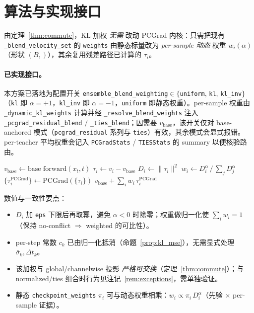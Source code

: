 \documentclass[11pt,a4paper]{article}
\newcommand{\PC}{\mathrm{PCGrad}}
\newcommand{\vb}{v_{\mathrm{base}}}
\newcommand{\norm}[1]{\lVert #1\rVert}
\theoremstyle{plain}
\theoremstyle{definition}
\begin{document}
\section{算法与实现接口}

由定理~\ref{thm:commute}，KL 加权 \emph{无需} 改动 PCGrad 内核：只需把现有 \texttt{\_blend\_velocity\_set} 的 \texttt{weights} 由静态标量改为 \emph{per-sample 动态} 权重 $w_i(\alpha)$（形状 $(B,)$），其余复用残差路径已计算的 $\tau_i$。

\paragraph{已实现接口。} 本方案已落地为配置开关 \texttt{ensemble\_blend\_weighting}$\in\{$\texttt{uniform}, \texttt{kl}, \texttt{kl\_inv}$\}$（\texttt{kl} 即 $\alpha{=}{+}1$，\texttt{kl\_inv} 即 $\alpha{=}{-}1$，\texttt{uniform} 即静态权重）。per-sample 权重由 \texttt{\_dynamic\_kl\_weights} 计算并经 \texttt{\_resolve\_blend\_weights} 注入 \texttt{\_pcgrad\_residual\_blend} / \texttt{\_ties\_blend}；因需要 $\vb$，该开关仅对 base-anchored 模式（\texttt{pcgrad\_residual} 系列与 \texttt{ties}）有效，其余模式会显式报错。per-teacher 平均权重会记入 \texttt{PCGradStats} / \texttt{TIESStats} 的 summary 以便核验路由。

\begin{algorithm}[h]
\caption{KL-Weighted Residual Fusion（per denoising step, per sample）}
\begin{algorithmic}[1]
\State $\vb \gets \text{base forward}(x_t,t)$ 
 
  \State $\tau_i \gets v_i - \vb$
  \State $D_i \gets \norm{\tau_i}^2$ 
\EndFor
\State $w_i \gets D_i^{\alpha}\,/\,\sum_j D_j^{\alpha}$ 
\State $\{\tau_i^{\PC}\} \gets \PC(\{\tau_i\})$ 
\State \Return $\vb + \sum_i w_i\,\tau_i^{\PC}$ 
\end{algorithmic}
\end{algorithm}

\noindent 数值与一致性要点：
\begin{itemize}[leftmargin=1.6em]
\item $D_i$ 加 \texttt{eps} 下限后再取幂，避免 $\alpha<0$ 时除零；权重做归一化使 $\sum_i w_i=1$（保持 no-conflict $\Rightarrow$ weighted 的可比性）。
\item per-step 常数 $c_k$ 已由归一化抵消（命题~\ref{prop:kl_mse}），无需显式处理 $\bar\sigma_k,\Delta t_k$。
\item 该加权与 global/channelwise 投影 \emph{严格可交换}（定理~\ref{thm:commute}）；与 normalized/ties 组合时行为见注记~\ref{rem:exceptions}，需单独验证。
\item 静态 \texttt{checkpoint\_weights} $\pi_i$ 可与动态权重相乘：$w_i\propto\pi_i\,D_i^{\alpha}$（先验 $\times$ per-sample 证据）。
\end{itemize}
\end{document}
